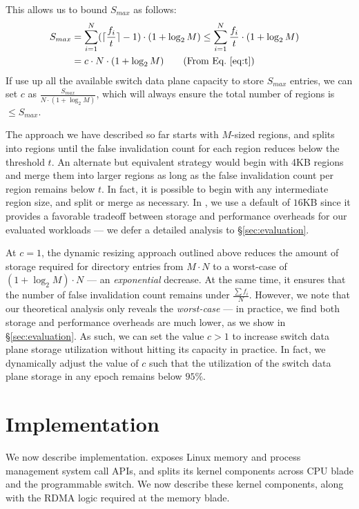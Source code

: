 This allows us to bound $S_{max}$ as follows:
\begin{align*}
  S_{max} &= \sum\limits_{i=1}^{N} (\lceil\frac{f_i}{t}\rceil - 1) \cdot (1+\log_2{M}) \leq \sum\limits_{i=1}^{N} \frac{f_i}{t} \cdot (1+\log_2{M})                &\\
          &= c \cdot N \cdot (1+\log_2{M}) \text{$\qquad$(From Eq.~\ref{eq:t})}
\end{align*}
\noindent
If use up all the available switch data plane capacity to store $S_{max}$ entries, we can set $c$ as $\frac{S_{max}}{N\cdot(1+\log_2{M})}$, which will always ensure the total number of regions is $\leq S_{max}$.

 The approach we have described so far starts with $M$-sized regions, and splits into regions until the false invalidation count for each region reduces below the threshold $t$. An alternate but equivalent strategy would begin with 4KB regions and merge them into larger regions as long as the false invalidation count per region remains below $t$. In fact, it is possible to begin with any intermediate region size, and split or merge as necessary. In \mind, we use a default of $16$KB since it provides a favorable tradeoff between storage and performance overheads for our evaluated workloads --- we defer a detailed analysis to \S\ref{sec:evaluation}.

 At $c=1$, the dynamic resizing approach outlined above reduces the amount of storage required for directory entries from $M\cdot N$ to a worst-case of $(1+\log_2{M})\cdot N$ --- an \textit{exponential} decrease. At the same time, it ensures that the number of false invalidation count remains under $\frac{\sum f_i}{N}$. However, we note that our theoretical analysis only reveals the \textit{worst-case} --- in practice, we find both storage and performance overheads are much lower, as we show in \S\ref{sec:evaluation}. As such, we can set the value $c > 1$ to increase switch data plane storage utilization without hitting its capacity in practice. In fact, we dynamically adjust the value of $c$ such that the utilization of the switch data plane storage in any epoch remains below $95\%$.

\section{\mind Implementation}
\label{sec:mindimpl}

We now describe \mind implementation. \mind exposes Linux memory and process management system call APIs, and splits its kernel components across CPU blade and the programmable switch. We now describe these kernel components, along with the RDMA logic required at the memory blade.

